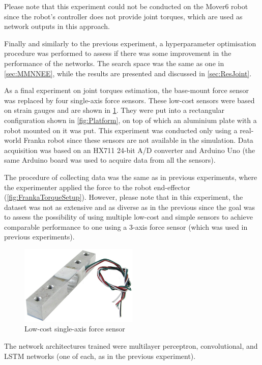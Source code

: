 Please note that this experiment could not be conducted on the Mover6 robot since the robot's controller does not provide joint torques, which are used as network outputs in this approach.

Finally and similarly to the previous experiment, a hyperparameter optimisation procedure was performed to assess if there was some improvement in the performance of the networks. The search space was the same as one in \cref{sec:MMNNEE}, while the results are presented and discussed in \cref{sec:ResJoint}.

As a final experiment on joint torques estimation, the base-mount force sensor was replaced by four single-axis force sensors. These low-cost sensors were based on strain gauges and are shown in \cref{fig:StrainGauge}. They were put into a rectangular configuration shown in \cref{fig:Platform}, on top of which an aluminium plate with a robot mounted on it was put. This experiment was conducted only using a real-world Franka robot since these sensors are not available in the simulation. Data acquisition was based on an HX711 24-bit A/D converter and Arduino Uno (the same Arduino board was used to acquire data from all the sensors).

The procedure of collecting data was the same as in previous experiments, where the experimenter applied the force to the robot end-effector (\cref{fig:FrankaTorqueSetup}). However, please note that in this experiment, the dataset was not as extensive and as diverse as in the previous since the goal was to assess the possibility of using multiple low-cost and simple sensors to achieve comparable performance to one using a 3-axis force sensor (which was used in previous experiments).

\begin{figure}
    \centering
    \includegraphics[width=0.5\textwidth]{slike/Load-Cell.png}
    \caption{Low-cost single-axis force sensor}
    \label{fig:StrainGauge}
\end{figure}

The network architectures trained were multilayer perceptron, convolutional, and LSTM networks (one of each, as in the previous experiment).

